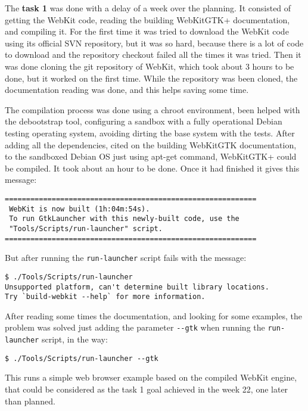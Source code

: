 \documentclass[a4paper,11pt,openany]{report}
\begin{document}
The \textbf{task 1} was done with a delay of a week over the planning. It consisted of getting the WebKit code, reading the building WebKitGTK+\cite{build webkitgtk+} documentation, and compiling it.
For the first time it was tried to download the WebKit code using its official SVN repository, but it was so hard, because there is a lot of code to download and the repository checkout failed all the times it was tried. Then it was done cloning the git repository of WebKit\cite{git webkit}, which took about 3 hours to be done, but it worked on the first time.
While the repository was been cloned, the documentation reading was done, and this helps saving some time.

The compilation process was done using a chroot\cite{chroot} environment, been helped with the debootstrap\cite{debootstrap} tool, configuring a sandbox with a fully operational Debian testing operating system, avoiding dirting the base system with the tests.
After adding all the dependencies, cited on the building WebKitGTK documentation, to the sandboxed Debian OS just using apt-get command, WebKitGTK+ could be compiled. It took about an hour to be done. Once it had finished it gives this message:

{
\footnotesize
\begin{lstlisting}
===========================================================
 WebKit is now built (1h:04m:54s).
 To run GtkLauncher with this newly-built code, use the
 "Tools/Scripts/run-launcher" script.
===========================================================
\end{lstlisting}
}

But after running the \verb#run-launcher# script fails with the message:

{
\footnotesize
\begin{lstlisting}
$ ./Tools/Scripts/run-launcher
Unsupported platform, can't determine built library locations.
Try `build-webkit --help` for more information.
\end{lstlisting}
}

After reading some times the documentation, and looking for some examples, the problem was solved just adding the parameter \verb#--gtk# when running the \verb#run-launcher# script, in the way:

{
\footnotesize
\begin{lstlisting}
$ ./Tools/Scripts/run-launcher --gtk
\end{lstlisting}
}

This runs a simple web browser example based on the compiled WebKit engine, that could be considered as the task 1 goal achieved in the week 22, one later than planned.
\end{document}
